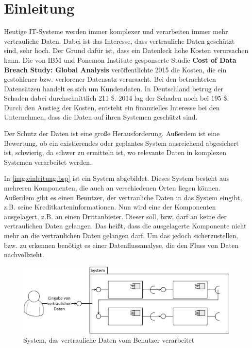 
\chapter{Einleitung}
\label{ch:einleitung}
Heutige IT-Systeme werden immer komplexer und verarbeiten immer mehr vertrauliche Daten. Dabei ist das Interesse, dass vertrauliche Daten geschützt sind, sehr hoch. Der Grund dafür ist, dass ein Datenleck hohe Kosten verursachen kann. Die von IBM und Ponemon Institute gesponserte Studie \textbf{Cost of Data Breach Study: Global Analysis} \cite{PonemonInsitute2015} veröffentlichte 2015 die Kosten, die ein gestohlener bzw. verlorener Datensatz verursacht. Bei den betrachteten Datensätzen handelt es sich um Kundendaten. In Deutschland betrug der Schaden dabei durchschnittlich 211 \$. 2014 lag der Schaden noch bei 195 \$. Durch den Anstieg der Kosten, entsteht ein finanzielles Interesse bei den Unternehmen, dass die Daten auf ihren Systemen geschützt sind. \par
Der Schutz der Daten ist eine große Herausforderung. Außerdem ist eine Bewertung, ob ein existierendes oder geplantes System ausreichend abgesichert ist, schwierig, da schwer zu ermitteln ist, wo relevante Daten in komplexen Systemen verarbeitet werden. \par
In \autoref{img:einleitung:bsp} ist ein System abgebildet. Dieses System besteht aus mehreren Komponenten, die auch an verschiedenen Orten liegen können. Außerdem gibt es einen Benutzer, der vertrauliche Daten in das System eingibt, z.B. seine Kreditkarteninformationen. Nun wird eine der Komponenten ausgelagert, z.B. an einen Drittanbieter. Dieser soll, bzw. darf an keine der vertraulichen Daten gelangen. Das heißt, dass die ausgelagerte Komponente nicht mehr an die vertraulichen Daten gelangen darf. Um das jedoch sicherzustellen, bzw. zu erkennen benötigt es einer Datenflussanalyse, die den Fluss von Daten nachvollzieht.
\begin{figure}[h]
	\centering
  	\includegraphics[width=1\textwidth]{images/einleitung_bsp.png}
	\caption{System, das vertrauliche Daten vom Benutzer verarbeitet}
	\label{img:einleitung:bsp}
\end{figure} 
